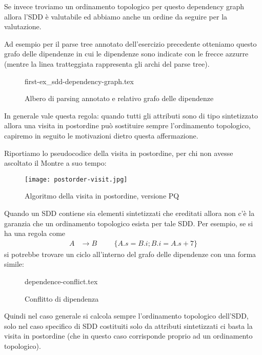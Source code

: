 \documentclass[class=book, crop=false, oneside, 12pt]{standalone}
\begin{document}
\noindent Se invece troviamo un ordinamento topologico per questo dependency graph allora l'SDD è valutabile ed abbiamo anche un ordine da seguire per la valutazione.

Ad esempio per il parse tree annotato dell'esercizio precedente otteniamo questo grafo delle dipendenze in cui le dipendenze sono indicate con le frecce azzurre (mentre la linea tratteggiata rappresenta gli archi del parse tree).
\begin{figure}[H]
    \centering
    {first-ex_sdd-dependency-graph.tex}
    \caption{Albero di parsing annotato e relativo grafo delle dipendenze}
    \label{fig:first-ex_SDD-dependency-graph}
\end{figure}
In generale vale questa regola: quando tutti gli attributi sono di tipo sintetizzato allora una visita in postordine può sostituire sempre l'ordinamento topologico, capiremo in seguito le motivazioni dietro questa affermazione.

Riportiamo lo pseudocodice della visita in postordine, per chi non avesse ascoltato il Montre a suo tempo:
\begin{figure}[H]
    \centering
    \texttt{[image: postorder-visit.jpg]}
    \caption{Algoritmo della visita in postordine, versione PQ}
    \label{fig:postorder-visit}
\end{figure}
Quando un SDD contiene sia elementi sintetizzati che ereditati allora non c'è la garanzia che un ordinamento topologico esista per tale SDD.
Per esempio, se si ha una regola come 
\begin{align*}
    A &\to B & & &\{A.s = B.i; B.i = A.s+7\} 
\end{align*}
si potrebbe trovare un ciclo all'interno del grafo delle dipendenze con una forma simile:
\begin{figure}[H]
    \centering
    {dependence-conflict.tex}
    \caption{Conflitto di dipendenza}
    \label{fig:dependence-conflict}
\end{figure}
Quindi nel caso generale si calcola sempre l'ordinamento topologico dell'SDD, solo nel caso specifico di SDD costituiti solo da attributi sintetizzati ci basta la visita in postordine (che in questo caso corrisponde proprio ad un ordinamento topologico).
\end{document}
